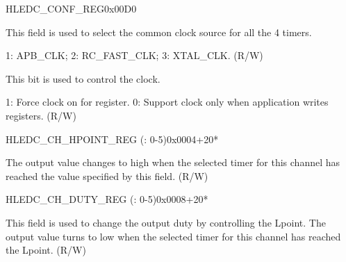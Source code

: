 \begin{register}{H}{LEDC\_CONF\_REG}{0x00D0}\label{regdesc:LEDCCONFREG}
%
%
%
\regnewline%
\begin{regdesc}\begin{reglist}
\label{fielddesc:LEDCAPBCLKSEL}\item [LEDC\_APB\_CLK\_SEL] This field is used to select the common clock source for all the 4 timers.

1: APB\_CLK; 2: RC\_FAST\_CLK; 3: XTAL\_CLK. (R/W)
\label{fielddesc:LEDCCLKEN}\item [LEDC\_CLK\_EN] This bit is used to control the clock.

1: Force clock on for register. 0: Support clock only when application writes registers. (R/W)
\end{reglist}\end{regdesc}
\end{register}


\begin{register}{H}{LEDC\_CH\_HPOINT\_REG (: 0-5)}{0x0004+20*}\label{regdesc:LEDCCHNHPOINTREG}
%
%
\regnewline%
\begin{regdesc}\begin{reglist}
\label{fielddesc:LEDCHPOINTCHN}\item [LEDC\_HPOINT\_CH\regindex{n}] The output value changes to high when the selected timer for this channel has reached the value specified by this field. (R/W)
\end{reglist}\end{regdesc}
\end{register}


\begin{register}{H}{LEDC\_CH\_DUTY\_REG (: 0-5)}{0x0008+20*}\label{regdesc:LEDCCHNDUTYREG}
%
%
\regnewline%
\begin{regdesc}\begin{reglist}
\label{fielddesc:LEDCDUTYCHN}\item [LEDC\_DUTY\_CH\regindex{n}] This field is used to change the output duty by controlling the Lpoint. The output value turns to low when the selected timer for this channel has reached the Lpoint. (R/W)
\end{reglist}\end{regdesc}
\end{register}



